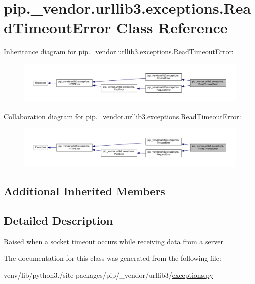 \hypertarget{classpip_1_1__vendor_1_1urllib3_1_1exceptions_1_1ReadTimeoutError}{}\section{pip.\+\_\+vendor.\+urllib3.\+exceptions.\+Read\+Timeout\+Error Class Reference}
\label{classpip_1_1__vendor_1_1urllib3_1_1exceptions_1_1ReadTimeoutError}


Inheritance diagram for pip.\+\_\+vendor.\+urllib3.\+exceptions.\+Read\+Timeout\+Error\+:
\nopagebreak
\begin{figure}[H]
\begin{center}
\leavevmode
\includegraphics[width=350pt]{classpip_1_1__vendor_1_1urllib3_1_1exceptions_1_1ReadTimeoutError__inherit__graph}
\end{center}
\end{figure}


Collaboration diagram for pip.\+\_\+vendor.\+urllib3.\+exceptions.\+Read\+Timeout\+Error\+:
\nopagebreak
\begin{figure}[H]
\begin{center}
\leavevmode
\includegraphics[width=350pt]{classpip_1_1__vendor_1_1urllib3_1_1exceptions_1_1ReadTimeoutError__coll__graph}
\end{center}
\end{figure}
\subsection*{Additional Inherited Members}


\subsection{Detailed Description}
\begin{DoxyVerb}Raised when a socket timeout occurs while receiving data from a server\end{DoxyVerb}
 

The documentation for this class was generated from the following file\+:\begin{DoxyCompactItemize}
\item 
venv/lib/python3./site-\/packages/pip/\+\_\+vendor/urllib3/\hyperlink{pip_2__vendor_2urllib3_2exceptions_8py}{exceptions.\+py}\end{DoxyCompactItemize}

